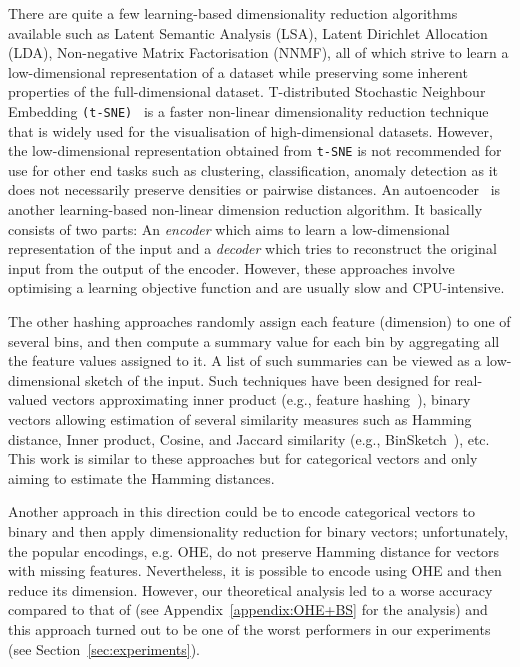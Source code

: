 There are quite a few learning-based dimensionality reduction algorithms available such as {Latent Semantic Analysis (LSA)}\cite{LSI}, {Latent Dirichlet Allocation (LDA)}\cite{LDA}, {Non-negative Matrix Factorisation (NNMF)}\cite{NNMF},  all of which strive to learn a low-dimensional representation of a dataset while preserving some inherent properties of the full-dimensional dataset.  T-distributed Stochastic Neighbour Embedding \texttt{(t-SNE)}~\cite{vanDerMaaten2008} is a faster non-linear dimensionality reduction technique that is widely used for the visualisation of high-dimensional datasets. However, the low-dimensional representation obtained from \texttt{t-SNE} is not recommended for use for other end tasks such as clustering, classification, anomaly detection as it does not necessarily preserve densities or pairwise distances. An autoencoder~\cite{Goodfellow-et-al-2016} is another learning-based non-linear dimension reduction algorithm. It basically consists of two parts: An \textit{encoder} which aims to learn a low-dimensional representation of the input and a \textit{decoder} which tries to reconstruct the original input from the output of the encoder. However, these approaches involve optimising a learning objective function and are usually slow and CPU-intensive.

The other hashing approaches randomly assign each feature (dimension) to one of several bins, and then compute a summary value for each bin by aggregating all the feature values assigned to it. A list of such summaries can be viewed as a low-dimensional sketch of the input. Such techniques have been designed for real-valued vectors approximating inner product (e.g., feature hashing~\cite{WeinbergerDLSA09}), binary vectors allowing estimation of several similarity measures such as Hamming distance, Inner product, Cosine, and Jaccard similarity (e.g., BinSketch~\cite{ICDM}), etc. This work is similar to these approaches but for categorical vectors and only aiming to estimate the Hamming distances.

Another approach in this direction could be to encode categorical vectors to binary and then apply dimensionality reduction for binary vectors; unfortunately, the popular encodings, e.g. OHE, do not preserve Hamming distance for vectors with missing features. Nevertheless, it is possible to encode using OHE and then reduce its dimension. However, our theoretical analysis led to a worse accuracy compared to that of \fsketch (see Appendix~\ref{appendix:OHE+BS} for the analysis) and this approach turned out to be one of the worst performers in our experiments (see Section~\ref{sec:experiments}).

